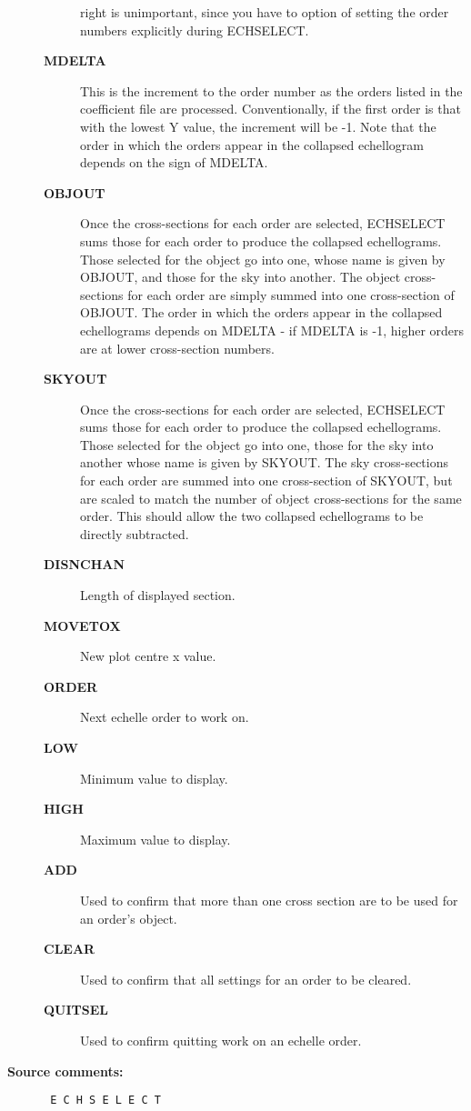 \begin{description}
\begin{description}
 right is unimportant, since you have to option of setting the order
 numbers explicitly during ECHSELECT.
\item [{\bf MDELTA}]
 This is the increment to the order number as the orders listed in the
 coefficient file are processed. Conventionally, if the first order is
 that with the lowest Y value, the increment will be -1.  Note that
 the order in which the orders appear in the collapsed echellogram
 depends on the sign of MDELTA.
\item [{\bf OBJOUT}]
 Once the cross-sections for each order are selected, ECHSELECT sums
 those for each order to produce the collapsed echellograms.  Those
 selected for the object go into one, whose name is given by OBJOUT,
 and those for the sky into another.  The object cross-sections for
 each order are simply summed into one cross-section of OBJOUT.  The
 order in which the orders appear in the collapsed echellograms
 depends on MDELTA - if MDELTA is -1, higher orders are at lower
 cross-section numbers.
\item [{\bf SKYOUT}]
 Once the cross-sections for each order are selected, ECHSELECT sums
 those for each order to produce the collapsed echellograms.  Those
 selected for the object go into one, those for the sky into another
 whose name is given by SKYOUT.  The sky cross-sections for each order
 are summed into one cross-section of SKYOUT, but are scaled to match
 the number of object cross-sections for the same order.  This should
 allow the two collapsed echellograms to be directly subtracted.
\item [{\bf DISNCHAN}]
 Length of displayed section.
\item [{\bf MOVETOX}]
 New plot centre x value.
\item [{\bf ORDER}]
 Next echelle order to work on.
\item [{\bf LOW}]
 Minimum value to display.
\item [{\bf HIGH}]
 Maximum value to display.
\item [{\bf ADD}]
 Used to confirm that more than one cross section are to be used for
 an order's object.
\item [{\bf CLEAR}]
 Used to confirm that all settings for an order to be cleared.
\item [{\bf QUITSEL}]
 Used to confirm quitting work on an echelle order.
\end{description}

\item [{\bf Source comments:}]
\begin{verbatim}
 E C H S E L E C T


\end{verbatim}
\end{description}
